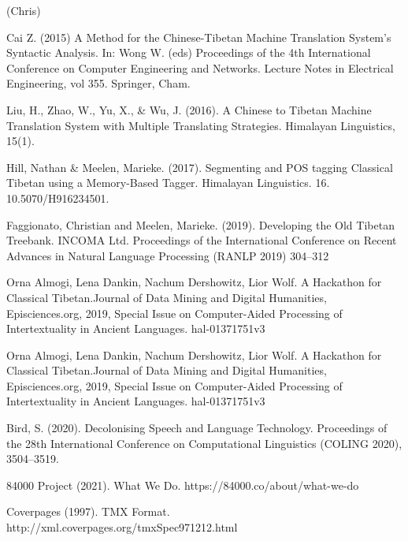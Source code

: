 \documentclass[letterpaper, 12 pt, conference]{ieeeconf}  %
\begin{document}
(Chris)
\begin{thebibliography}{99}



 Cai Z. (2015) A Method for the Chinese-Tibetan Machine Translation System’s Syntactic Analysis. In: Wong W. (eds) Proceedings of the 4th International Conference on Computer Engineering and Networks. Lecture Notes in Electrical Engineering, vol 355. Springer, Cham. 

 Liu, H., Zhao, W., Yu, X., & Wu, J. (2016). A Chinese to Tibetan Machine Translation System with Multiple Translating Strategies. Himalayan Linguistics, 15(1).

 Hill, Nathan & Meelen, Marieke. (2017). Segmenting and POS tagging Classical Tibetan using a Memory-Based Tagger. Himalayan Linguistics. 16. 10.5070/H916234501. 

 Faggionato, Christian  and Meelen, Marieke. (2019). Developing the Old Tibetan Treebank. INCOMA Ltd. Proceedings of the International Conference on Recent Advances in Natural Language Processing (RANLP 2019) 304--312


 Orna Almogi, Lena Dankin, Nachum Dershowitz, Lior Wolf. A Hackathon for Classical Tibetan.Journal of Data Mining and Digital Humanities, Episciences.org, 2019, Special Issue on Computer-Aided Processing of Intertextuality in Ancient Languages. hal-01371751v3

 Orna Almogi, Lena Dankin, Nachum Dershowitz, Lior Wolf. A Hackathon for Classical Tibetan.Journal of Data Mining and Digital Humanities, Episciences.org, 2019, Special Issue on Computer-Aided Processing of Intertextuality in Ancient Languages. hal-01371751v3


 Bird, S. (2020). Decolonising Speech and Language Technology. Proceedings of the 28th International Conference on Computational Linguistics (COLING 2020), 3504–3519.


 84000 Project (2021). What We Do. https://84000.co/about/what-we-do


 Coverpages (1997). TMX Format. http://xml.coverpages.org/tmxSpec971212.html




\end{thebibliography}
\end{document}
